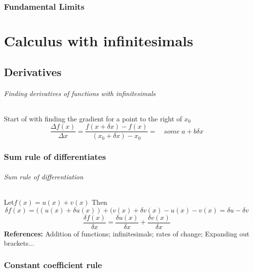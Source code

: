 \documentclass[12pt, a4paper,oneside]{book}
\begin{document}
    \section{Fundamental Limits}
        

\part {Calculus with infinitesimals}
\chapter{Derivatives}
\paragraph{Finding derivatives of functions with infinitesimals}
\begin{paragraph}
Start of with finding the gradient for a point to the right of \(x_0\) \[\frac{\Delta f(x)}{\Delta x}= \frac{f(x+ \delta x) -f(x)}{(x_0+\delta x)-x_0} = \quad some \; a+ b\delta x \]
\end{paragraph}
\section{Sum rule of differentiates}
\paragraph{Sum rule of differentiation}
\begin{paragraph}
Let\( f(x) = u(x) + v(x) \) Then
\[ \delta f(x) = ((u(x) + \delta u(x)) + (v(x) + \delta v(x) - u(x) -v(x) = \delta u-\delta v\]
\[ \frac{\delta f(x)}{\delta x} = \frac{\delta u(x)}{\delta x}+\frac{\delta v(x)}{\delta x}\]
\textbf{ References:} Addition of functions; infinitesimals; rates of change; Expanding out brackets...
\end{paragraph}

\section{ Constant coefficient rule}
\end{document}
